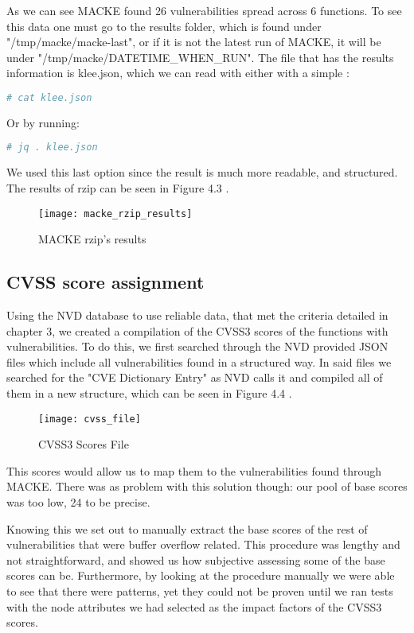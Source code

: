 As we can see MACKE found 26 vulnerabilities spread across 6 functions. To see this data one must go to the results folder, which is found under "/tmp/macke/macke-last", or if it is not the latest run of MACKE, it will be under "/tmp/macke/DATETIME\_WHEN\_RUN". The file that has the results information is klee.json, which we can read with either with a simple :

\begin{lstlisting}[language=bash]
# cat klee.json
\end{lstlisting}

Or by running:

\begin{lstlisting}[language=bash]
# jq . klee.json
\end{lstlisting}

We used this last option since the result is much more readable, and structured. The results of rzip can be seen in Figure 4.3 .

\begin{figure}[H]
	\caption{MACKE rzip's results}
	\centering
	\texttt{[image: macke\_rzip\_results]}
\end{figure}

\subsection{CVSS score assignment}

Using the NVD database to use reliable data, that met the criteria detailed in chapter 3, we created a compilation of the CVSS3 scores of the functions with vulnerabilities. To do this, we first searched through the NVD provided JSON files which include all vulnerabilities found in a structured way. In said files we searched for the "CVE Dictionary Entry" as NVD calls it \parencite{nvd} and compiled all of them in a new structure, which can be seen in Figure 4.4 .

\begin{figure}[H]
	\caption{CVSS3 Scores File}
	\centering
	\texttt{[image: cvss\_file]}
\end{figure}

This scores would allow us to map them to the vulnerabilities found through MACKE. There was as problem with this solution though: our pool of base scores was too low, 24 to be precise.

Knowing this we set out to manually extract the base scores of the rest of vulnerabilities that were buffer overflow related. This procedure was lengthy and not straightforward, and showed us how subjective assessing some of the base scores can be. Furthermore, by looking at the procedure manually we were able to see that there were patterns, yet they could not be proven until we ran tests with the node attributes we had selected as the impact factors of the CVSS3 scores.

